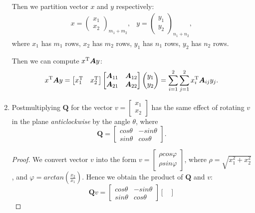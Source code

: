 \begin{enumerate}
Then we partition vector $x$ and $y$ respectively:
\[
\begin{array}{ll}
x = \begin{pmatrix}
x_1\\x_2
\end{pmatrix}_{m_1+m_2},
&
y = \begin{pmatrix}
y_1\\y_2
\end{pmatrix}_{n_1+n_2},
\end{array}
\]
where $x_1$ has $m_1$ rows, $x_2$ has $m_2$ rows, $y_1$ has $n_1$ rows, $y_2$ has $n_2$ rows.

Then we can compute $x^{\mathrm T}\bm A y$:
\[
x^{\mathrm T}\bm A y = \begin{bmatrix}
x_1^{\mathrm T}&x_2^{\mathrm T}
\end{bmatrix}\begin{bmatrix}
\bm A_{11}&\bm A_{12}\\\bm A_{21}&\bm A_{22}
\end{bmatrix}\begin{pmatrix}
y_1\\y_2
\end{pmatrix} = \sum_{i=1}^{2}\sum_{j=1}^{2}x_{i}^{\mathrm T}\bm A_{ij} y_{j}.
\]
\item
\begin{proposition}
Postmultiplying $\bm Q$ for the vector $v = \begin{bmatrix}
x_1\\x_2
\end{bmatrix}$ has the same effect of rotating $v$ in the plane \textit{anticlockwise} by the angle $\theta$, where
\[
\bm Q = \begin{bmatrix}
cos\theta & -sin\theta \\ sin\theta & cos\theta
\end{bmatrix}.
\]
\end{proposition}
\begin{proof}
We convert vector $v$ into the form $v = \begin{bmatrix}
\rho cos\varphi\\\rho sin\varphi
\end{bmatrix}$, where $\rho = \sqrt{x_1^2+x_2^2}$, and $\varphi = arctan(\frac{x_2}{x_1})$. Hence we obtain the product of $\bm Q$ and $v$:
\[
\bm Qv = \begin{bmatrix}
cos\theta & -sin\theta \\ sin\theta & cos\theta
\end{bmatrix}\begin{bmatrix}

\end{bmatrix}\]
\end{proof}
\end{enumerate}
